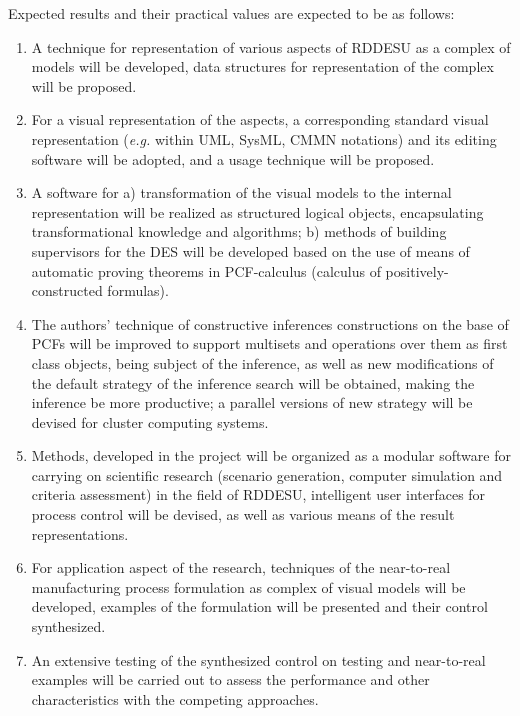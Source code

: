 \documentclass[conference,a4paper]{IEEEtran}
\begin{document}
Expected results and their practical values are expected to be as follows:
\begin{enumerate}
\item A technique for representation of various aspects of RDDESU as a complex of models will be developed, data structures for representation of the complex will be proposed.
\item For a visual representation of the aspects, a corresponding standard visual representation (\emph{e.g.} within UML, SysML, CMMN notations) and its editing software will be adopted, and a usage technique will be proposed.
\item A software for a) transformation of the visual models to the internal representation will be realized as structured logical objects, encapsulating transformational knowledge and algorithms; b) methods of building supervisors for the DES will be developed based on the use of means of automatic proving theorems in PCF-calculus (calculus of positively-constructed formulas).
\item The authors’ technique of constructive inferences constructions on the base of PCFs will be improved to support multisets and operations over them as first class objects, being subject of the inference, as well as new modifications of the default strategy of the inference search will be obtained, making the inference be more productive; a parallel versions of new strategy will be devised for cluster computing systems.
\item Methods, developed in the project will be organized as a modular software for carrying on scientific research (scenario generation, computer simulation and criteria assessment) in the field of RDDESU, intelligent user interfaces for process control will be devised, as well as various means of the result representations.
\item For application aspect of the research, techniques of the near-to-real manufacturing process formulation as complex of visual models will be developed, examples of the formulation will be presented and their control synthesized.
\item An extensive testing of the synthesized control on testing and near-to-real examples will be carried out to assess the performance and other characteristics with the competing approaches.
\end{enumerate}
\end{document}

